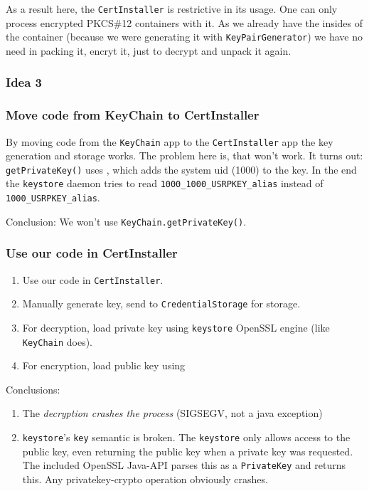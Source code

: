 \documentclass[a4paper]{scrartcl}
\begin{document}
			As a result here, the \texttt{CertInstaller} is restrictive in its usage. One can only process encrypted PKCS\#12 containers with it. As we already have the insides of the container (because we were generating it with \texttt{KeyPairGenerator}) we have no need in packing it, encryt it, just to decrypt and unpack it again.
			
		\subsubsection{Idea 3} %

		\subsubsection{Move code from KeyChain to CertInstaller}
			By moving code from the \texttt{KeyChain} app to the \texttt{CertInstaller} app the key generation and storage works. The problem here is, that  won't work. It turns out: \texttt{getPrivateKey()} uses , which adds the system uid (1000) to the key. In the end the \texttt{keystore} daemon tries to read \texttt{1000\_1000\_USRPKEY\_alias} instead of \texttt{1000\_USRPKEY\_alias}.
			
			Conclusion: We won't use \texttt{KeyChain.getPrivateKey()}.
			
		\subsubsection{Use our code in CertInstaller}
			\begin{enumerate}
				\item Use our code in \texttt{CertInstaller}.
				\item Manually generate key, send to \texttt{CredentialStorage} for storage.
				\item For decryption, load private key using \texttt{keystore} OpenSSL engine (like \texttt{KeyChain} does).
				\item For encryption, load public key using 
			\end{enumerate}
			Conclusions:
			\begin{enumerate}
				\item The \emph{decryption crashes the process} (SIGSEGV, not a java exception)
				\item \texttt{keystore}'s \texttt{key} semantic is broken. The \texttt{keystore} only allows access to the public key, even returning the public key when a private key was requested. The included OpenSSL Java-API parses this as a \texttt{PrivateKey} and returns this. Any privatekey-crypto operation obviously crashes.
			\end{enumerate}
		
\end{document}
